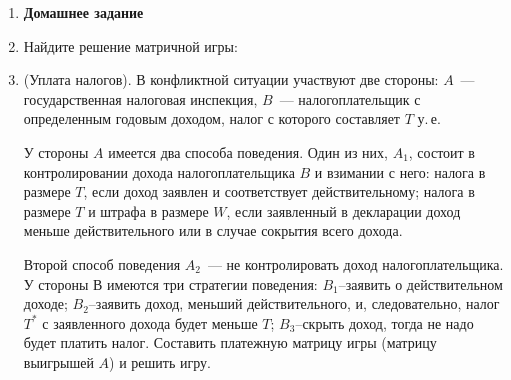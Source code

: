 \documentclass[a5paper,10pt]{extarticle}
\begin{document}
\begin{enumerate}
\item[] \textbf{Домашнее задание}
\item Найдите решение матричной игры:

 \item (Уплата налогов). В конфликтной ситуации участвуют две стороны: $A$~--- государственная  налоговая  инспекция, $B$~--- налогоплательщик  с определенным годовым доходом, налог с которого составляет $T$ у.\,е. 

 У стороны $A$ имеется два способа поведения. Один из них, $A_1$, состоит в контролировании дохода налогоплательщика $B$ и взимании с него:
налога в размере $T$, если доход заявлен и соответствует действительному; налога в размере $T$ и штрафа в размере $W$, если заявленный в декларации доход меньше действительного или в случае сокрытия всего дохода.

Второй способ поведения $A_2$~--- не контролировать доход налогоплательщика.
У стороны В имеются три стратегии поведения: 
$B_1$–заявить о действительном  доходе; 
$B_2$–заявить  доход,  меньший  действительного, и,  следовательно, налог $T^*$ с заявленного дохода будет меньше $T$; 
$B_3$–скрыть доход, тогда не надо будет платить налог.
Составить  платежную  матрицу  игры  (матрицу  выигрышей $A$)  и  решить игру.


\end{enumerate}
\end{document}
